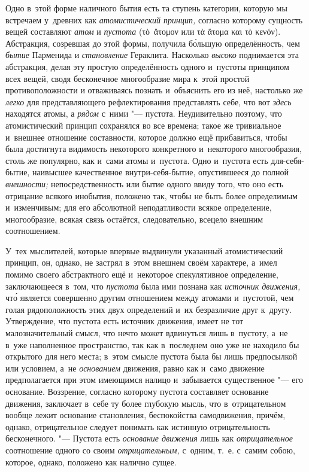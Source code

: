 
Одно в~этой форме наличного бытия есть та ступень категории, которую мы
встречаем у~древних как {\em атомистический принцип,}
согласно которому сущность вещей составляют {\em атом} и {\em пустота}
(\textgreek{τὸ~ἅτομον} или \textgreek{τὰ ἅτομα και τὸ κενόν}).
Абстракция, созревшая до этой формы, получила б\'{о}льшую определённость, чем
{\em бытие} Парменида и {\em становление} Гераклита. Насколько
{\em высоко} поднимается эта абстракция, делая эту
простую определённость одного и~пустоты принципом всех вещей, сводя
бесконечное многообразие мира к~этой простой противоположности и
отваживаясь познать и~объяснить его из неё, настолько же
{\em легко} для представляющего рефлектирования
представлять себе, что вот {\em здесь} находятся атомы,
а {\em рядом} с~ними "--- пустота. Неудивительно поэтому,
что атомистический принцип сохранялся во все времена; такое же тривиальное
и~внешнее отношение составности, которое должно ещё прибавиться, чтобы была
достигнута видимость некоторого конкретного и~некоторого многообразия,
столь же популярно, как и~сами атомы и~пустота. Одно и~пустота есть
для-себя-бытие, наивысшее качественное внутри-себя-бытие, опустившееся до
полной {\em внешности;} непосредственность или бытие
одного ввиду того, что оно есть отрицание всякого инобытия, положено так,
чтобы не быть более определимым и~изменчивым; для его абсолютной
неподатливости всякое определение, многообразие, всякая связь остаётся,
следовательно, всецело внешним соотношением.

У~тех мыслителей, которые впервые выдвинули указанный атомистический
принцип, он, однако, не застрял в~этом внешнем своём характере, а~имел
помимо своего абстрактного ещё и~некоторое спекулятивное определение,
заключающееся в~том, что {\em пустота} была ими познана
как {\em источник движения,} чт\'{о} является совершенно
другим отношением между атомами и~пустотой, чем голая рядоположность этих
двух определений и~их безразличие друг к~другу. Утверждение, что пустота
есть источник движения, имеет не тот малозначительный смысл, что нечто
может вдвинуться лишь в~пустоту, а~не в~уже наполненное пространство, так
как в~последнем оно уже не находило бы открытого для него места; в~этом
смысле пустота была бы лишь предпосылкой или условием, а~не
{\em основанием} движения, равно как и~само движение
предполагается при этом имеющимся налицо и~забывается существенное "--- его
основание. Воззрение, согласно которому пустота составляет основание
движения, заключает в~себе ту более глубокую мысль, что в~отрицательном
вообще лежит основание становления, беспокойства самодвижения, причём,
однако, отрицательное следует понимать как истинную отрицательность
бесконечного. "--- Пустота есть {\em основание движения}
лишь как {\em отрицательное} соотношение одного со
своим {\em отрицательным,} с~одним, т.~е. с~самим
собою, которое, однако, положено как налично сущее.

